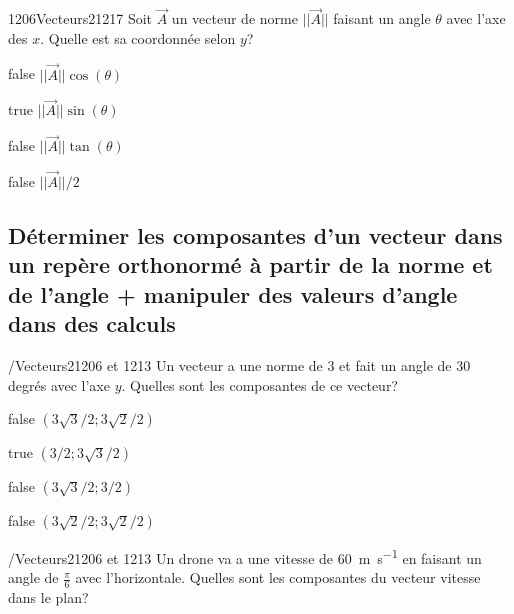 \documentclass[11pt]{article}
\begin{document}
        	\begin{question}{1206}{Vecteurs}{2}{1217}
				Soit $\vec{A}$ un vecteur de norme $||\vec{A}||$ faisant un angle $\theta$ avec l'axe des $x$. Quelle est sa coordonnée selon $y$?
            \end{question}

            \begin{reponses}
            	\item[false] $||\vec{A}||\cos(\theta)$
            	\item[true] $||\vec{A}||\sin(\theta)$
                \item[false] $||\vec{A}||\tan(\theta)$
                \item[false] $||\vec{A}||/2$
            \end{reponses}
            
		\subsection{Déterminer les composantes d'un vecteur dans un repère orthonormé à partir de la norme et de l'angle + manipuler des valeurs d'angle dans des calculs}

            \begin{question}{/}{Vecteurs}{2}{1206 et 1213}
                Un vecteur a une norme de 3 et fait un angle de 30 degrés avec l'axe $y$. Quelles sont les composantes de ce vecteur?
            \end{question}

            \begin{reponses}
                \item[false] $(3\sqrt{3}/2;3\sqrt{2}/2)$ 
                \item[true] $(3/2;3\sqrt{3}/2)$ 
                \item[false] $(3\sqrt{3}/2;3/2)$ 
                \item[false] $(3\sqrt{2}/2;3\sqrt{2}/2)$ 
            \end{reponses}

            \begin{question}{/}{Vecteurs}{2}{1206 et 1213}
                Un drone va a une vitesse de \SI{60}{\meter\per\second} en faisant un angle de $\frac{\pi}{6}$ avec l'horizontale. Quelles sont les composantes du vecteur vitesse dans le plan?
            \end{question}
\end{document}
